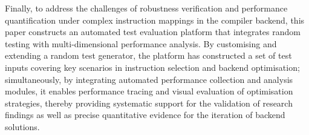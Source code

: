\documentclass[type=master]{fduthesis}
\begin{document}
\begin{abstract*}
	Finally, to address the challenges of robustness verification and performance quantification under complex instruction mappings in the compiler backend, this paper constructs an automated test evaluation platform that integrates random testing with multi-dimensional performance analysis. By customising and extending a random test generator, the platform has constructed a set of test inputs covering key scenarios in instruction selection and backend optimisation; simultaneously, by integrating automated performance collection and analysis modules, it enables performance tracing and visual evaluation of optimisation strategies, thereby providing systematic support for the validation of research findings as well as precise quantitative evidence for the iteration of backend solutions.
	\end{abstract*}
	
	\mainmatter
	
	
	
	
	
	
	
	
	
	
	
	
	
	
	
	
	
	
	
	
	\appendix
	
	\backmatter
	
	\printbibliography
	
\end{document}
